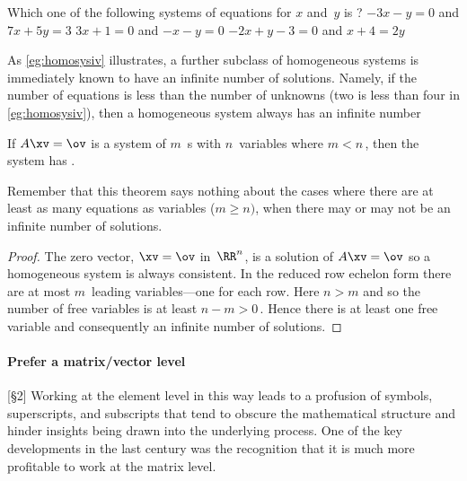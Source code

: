 \begin{activity}
Which one of the following systems of equations for \(x\) and~\(y\) is ?
{\(-3x-y=0\) and \(7x+5y=3\)}
{\(3x+1=0\) and \(-x-y=0\)}
{\(-2x+y-3=0\) and \(x+4=2y\)}
\end{activity}





As \cref{eg:homosysiv} illustrates, a further subclass of homogeneous systems is immediately known to have an infinite number of solutions.
Namely, if the number of equations is less than the number of unknowns (two is less than four in \cref{eg:homosysiv}), then a homogeneous system always has an infinite number 


\begin{theorem} \label{thm:feweqns} 
If \(A\xv=\ov\) is a  system of \(m\)~s with \(n\)~variables where \(m<n\)\,, then the system has .
\end{theorem}

Remember that this theorem says nothing about the cases where there are at least as many equations as variables (\(m\geq n)\), when there may or may not be an infinite number of solutions.

\begin{proof} 
The zero vector, \(\xv=\ov\) in~\(\RR^n\), is a solution of \(A\xv=\ov\) so a homogeneous system is always consistent.
In the reduced row echelon form there are at most \(m\)~leading variables---one for each row.
Here \(n>m\) and so the number of free variables is at least \(n-m>0\)\,.
Hence there is at least one free variable and consequently an infinite number of solutions.
\end{proof}




\paragraph{Prefer a matrix/vector level}
\begin{quoted}{\cite{Higham2015b} [\S2]}
Working at the element level in this way leads to a profusion of symbols, superscripts, and subscripts that tend to obscure the mathematical structure and hinder insights being drawn into the underlying process.
One of the key developments in the last century was the recognition that it is much more profitable to work at the matrix level.
\end{quoted}

